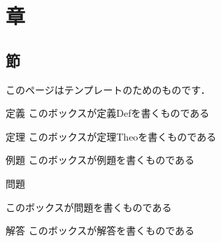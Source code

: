 \documentclass[
  letterpaper,
  DIV=11,
  numbers=noendperiod]{scrartcl}
\author{}
\date{}
\begin{document}
\section{章}\label{ux7ae0}

\subsection{節}\label{ux7bc0}

このページはテンプレートのためのものです．

\begin{Dbox}{定義}
このボックスが定義Defを書くものである

\end{Dbox}

\begin{Tbox}{定理}
このボックスが定理Theoを書くものである

\end{Tbox}

\begin{Rbox}{例題}
このボックスが例題を書くものである

\end{Rbox}

\begin{Qbox}{問題}

このボックスが問題を書くものである


\end{Qbox}

\begin{Abox}{解答}
このボックスが解答を書くものである

\end{Abox}
\end{document}

